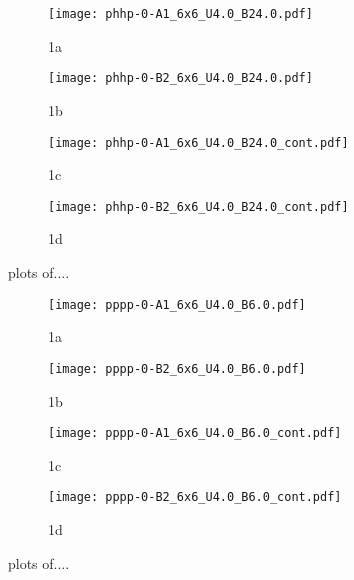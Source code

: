 \begin{figure}
  \begin{subfigure}{.5\textwidth}
    \centering
    \texttt{[image: phhp-0-A1\_6x6\_U4.0\_B24.0.pdf]}
    \caption{1a}
    \label{fig:sfig1}
  \end{subfigure}%
  \begin{subfigure}{.5\textwidth}
    \centering
    \texttt{[image: phhp-0-B2\_6x6\_U4.0\_B24.0.pdf]}
    \caption{1b}
    \label{fig:sfig2}
  \end{subfigure}
  \begin{subfigure}{.5\textwidth}
      \centering
      \texttt{[image: phhp-0-A1\_6x6\_U4.0\_B24.0\_cont.pdf]}
      \caption{1c}
      \label{fig:sfig3}
  \end{subfigure}
  \begin{subfigure}{.5\textwidth}
      \centering
      \texttt{[image: phhp-0-B2\_6x6\_U4.0\_B24.0\_cont.pdf]}
      \caption{1d}
      \label{fig:sfig4}
  \end{subfigure}
  \caption{plots of....}
  \label{fig:fig}
\end{figure}

\begin{figure}
  \begin{subfigure}{.5\textwidth}
    \centering
    \texttt{[image: pppp-0-A1\_6x6\_U4.0\_B6.0.pdf]}
    \caption{1a}
    \label{fig:sfig1}
  \end{subfigure}%
  \begin{subfigure}{.5\textwidth}
    \centering
    \texttt{[image: pppp-0-B2\_6x6\_U4.0\_B6.0.pdf]}
    \caption{1b}
    \label{fig:sfig2}
  \end{subfigure}
  \begin{subfigure}{.5\textwidth}
      \centering
      \texttt{[image: pppp-0-A1\_6x6\_U4.0\_B6.0\_cont.pdf]}
      \caption{1c}
      \label{fig:sfig3}
  \end{subfigure}
  \begin{subfigure}{.5\textwidth}
      \centering
      \texttt{[image: pppp-0-B2\_6x6\_U4.0\_B6.0\_cont.pdf]}
      \caption{1d}
      \label{fig:sfig4}
  \end{subfigure}
  \caption{plots of....}
  \label{fig:fig}
\end{figure}

